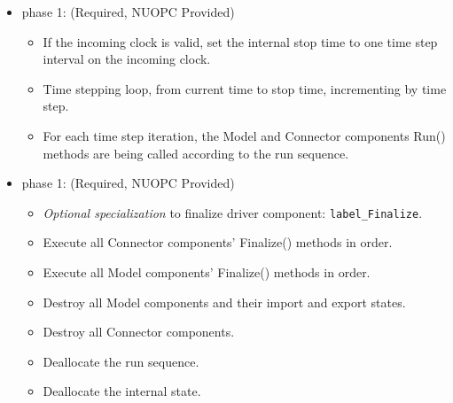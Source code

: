 \begin{itemize}
\item phase 1: ({\sc Required, NUOPC Provided})
  \begin{itemize}
  \item If the incoming clock is valid, set the internal stop time to one time step interval on the incoming clock.
  \item Time stepping loop, from current time to stop time, incrementing by time step.
  \item For each time step iteration, the Model and Connector components Run() methods are being called according to the run sequence.
  \end{itemize}    
\end{itemize}

\begin{itemize}
\item phase 1: ({\sc Required, NUOPC Provided})
  \begin{itemize}
  \item {\it Optional specialization} to finalize driver component: {\tt label\_Finalize}.
  \item Execute all Connector components' Finalize() methods in order.
  \item Execute all Model components' Finalize() methods in order.
  \item Destroy all Model components and their import and export states.
  \item Destroy all Connector components.
  \item Deallocate the run sequence.
  \item Deallocate the internal state.
  \end{itemize}      
\end{itemize}

\mbox{}\hrulefill\ 


